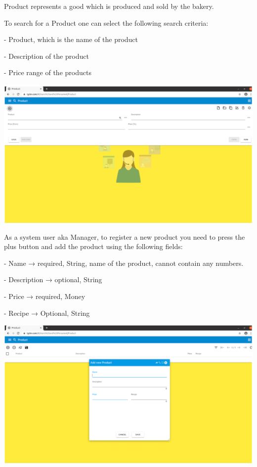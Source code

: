 Product represents a good which is produced and sold by the bakery.

To search for a Product one can select the following search criteria:

- Product, which is the name of the product

- Description of the product

- Price range of the products

\includegraphics[width=\textwidth]{sections/01-chapter/images/product1.png}

As a system user aka Manager, to register a new product you need to press the plus button and add the product using the following fields:

- Name → required, String, name of the product, cannot contain any numbers.

- Description → optional, String

- Price → required, Money

- Recipe → Optional, String

\includegraphics[width=\textwidth]{sections/01-chapter/images/product2.png}

